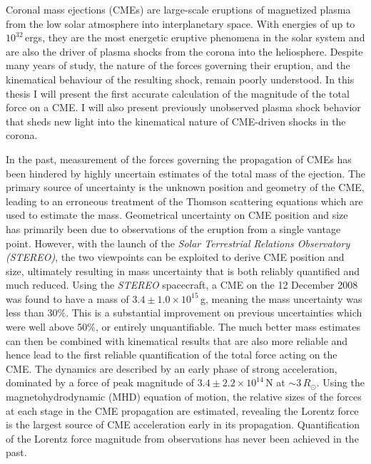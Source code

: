 
\begin{abstracts} 

Coronal mass ejections (CMEs) are large-scale eruptions of magnetized plasma from the low solar atmosphere into interplanetary space. With energies of up to $10^{32}$\,ergs, they are the most energetic eruptive phenomena in the solar system and are also the driver of plasma shocks from the corona into the heliosphere. Despite many years of study, the nature of the forces governing their eruption, and the kinematical {\color{black}behaviour} of the resulting shock, remain poorly understood. In this thesis I will present the first accurate calculation of the magnitude of the total force on a CME. I will also present previously unobserved plasma shock behavior that sheds new light into the kinematical nature of CME-driven shocks in the corona.

In the past, measurement of the forces governing the propagation of CMEs has been hindered by highly uncertain estimates of the total mass of the ejection. The primary source of uncertainty is the unknown position and geometry of the CME, leading to an erroneous treatment of the Thomson scattering equations which are used to estimate the mass. Geometrical uncertainty on CME position and size has primarily been due to observations of the eruption from a single vantage point. However, with the launch of the {\it Solar Terrestrial Relations Observatory (STEREO)}, the two viewpoints can be exploited to derive CME position and size, ultimately resulting in mass uncertainty that is both reliably quantified and much reduced. Using the {\it STEREO} spacecraft, a CME on the 12 December 2008 was found to have a mass of $3.4\pm1.0\times10^{15}$\,g, meaning the mass uncertainty was less than 30\%. This is a substantial improvement on previous uncertainties which were well above 50\%, or entirely unquantifiable. The much better mass estimates can then be combined with kinematical results that are also more reliable and hence lead to the first reliable quantification of the total force acting on the CME. The dynamics are described by an early phase of strong acceleration, dominated by a force of peak magnitude of $3.4\pm2.2\times10^{14}$\,N at $\sim$3\,$R_{\odot}$. Using the magnetohydrodynamic (MHD) equation of motion, the relative sizes of the forces at each stage in the CME propagation are estimated, revealing the Lorentz force is the largest source of CME acceleration early in its propagation. Quantification of the Lorentz force magnitude from observations has never been achieved in the past.



\end{abstracts}
